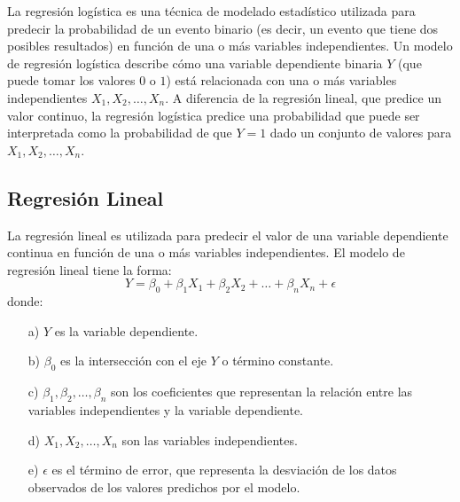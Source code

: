 \documentclass[a4paper]{report} %
\begin{document}
La regresi\'on log\'istica es una t\'ecnica de modelado estad\'istico utilizada para predecir la probabilidad de un evento binario (es decir, un evento que tiene dos posibles resultados) en funci\'on de una o m\'as variables independientes.  Un modelo de regresi\'on log\'istica describe c\'omo una variable dependiente binaria $Y$ (que puede tomar los valores $0$ o $1$) est\'a relacionada con una o m\'as variables independientes $X_1, X_2, \ldots, X_n$. A diferencia de la regresi\'on lineal, que predice un valor continuo, la regresi\'on log\'istica predice una probabilidad que puede ser interpretada como la probabilidad de que $Y=1$ dado un conjunto de valores para $X_1, X_2, \ldots, X_n$.

\subsection{Regresi\'on Lineal}

La regresi\'on lineal es utilizada para predecir el valor de una variable dependiente continua en funci\'on de una o m\'as variables independientes. El modelo de regresi\'on lineal tiene la forma:
\begin{equation}
Y = \beta_0 + \beta_1 X_1 + \beta_2 X_2 + \ldots + \beta_n X_n + \epsilon
\end{equation}
donde:
\begin{itemize}
    \item[a) ] $Y$ es la variable dependiente.
    \item[b) ] $\beta_0$ es la intersecci\'on con el eje $Y$ o t\'ermino constante.
    \item[c) ] $\beta_1, \beta_2, \ldots, \beta_n$ son los coeficientes que representan la relaci\'on entre las variables independientes y la variable dependiente.
    \item[d) ] $X_1, X_2, \ldots, X_n$ son las variables independientes.
    \item[e) ] $\epsilon$ es el t\'ermino de error, que representa la desviaci\'on de los datos observados de los valores predichos por el modelo.
\end{itemize}
\end{document}
